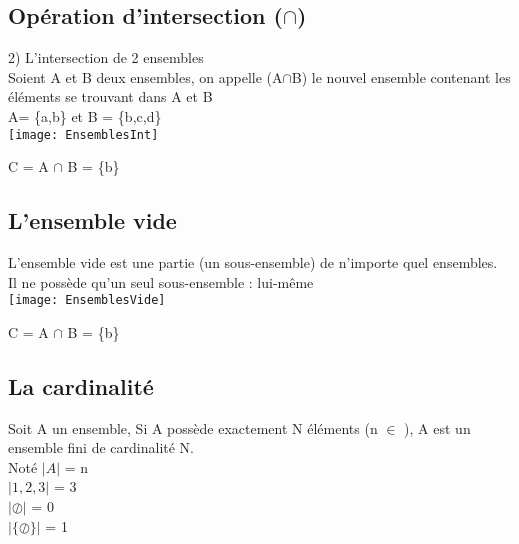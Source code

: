 \subsection{Opération d'intersection ($\cap$)}
\vspace{3mm} %

2) L'intersection de 2 ensembles \\

Soient A et B deux ensembles, on appelle (A$\cap$B) le nouvel ensemble contenant les éléments se trouvant dans A et B\\
A= \{a,b\} et B = \{b,c,d\} \\

\texttt{[image: EnsemblesInt]}

C = A $\cap$ B = \{b\} \\

\vspace{3mm} %
\subsection{L'ensemble vide}
\vspace{3mm} %

L'ensemble vide est une partie (un sous-ensemble) de n'importe quel ensembles.\\
Il ne possède qu'un seul sous-ensemble : lui-même \\

\texttt{[image: EnsemblesVide]}
\vspace{3mm} %

C = A $\cap$ B = \{b\} \\

\vspace{3mm} %
\subsection{La cardinalité}
\vspace{3mm} %

Soit A un ensemble, Si A possède exactement N éléments (n $\in$ \N), A est un ensemble fini de cardinalité N.\\
Noté $|A|$ = n \\

$|1,2,3|$ = 3 \\
$|\oslash|$ = 0 \\
$|\{\oslash\}|$ = 1 \\

